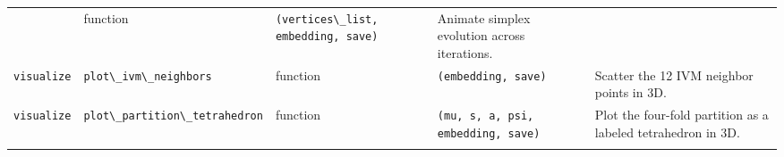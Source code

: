 \documentclass[
  10pt,
]{article}
\newcommand{\passthrough}[1]{#1}
\begin{document}
\begin{longtable}[]{@{}lllll@{}}
\begin{minipage}[t]{0.17\columnwidth}
\end{minipage} & \begin{minipage}[t]{0.17\columnwidth}\raggedright
function\strut
\end{minipage} & \begin{minipage}[t]{0.17\columnwidth}\raggedright
\passthrough{\lstinline!(vertices\_list, embedding, save)!}\strut
\end{minipage} & \begin{minipage}[t]{0.17\columnwidth}\raggedright
Animate simplex evolution across iterations.\strut
\end{minipage}\tabularnewline
\begin{minipage}[t]{0.17\columnwidth}\raggedright
\passthrough{\lstinline!visualize!}\strut
\end{minipage} & \begin{minipage}[t]{0.17\columnwidth}\raggedright
\passthrough{\lstinline!plot\_ivm\_neighbors!}\strut
\end{minipage} & \begin{minipage}[t]{0.17\columnwidth}\raggedright
function\strut
\end{minipage} & \begin{minipage}[t]{0.17\columnwidth}\raggedright
\passthrough{\lstinline!(embedding, save)!}\strut
\end{minipage} & \begin{minipage}[t]{0.17\columnwidth}\raggedright
Scatter the 12 IVM neighbor points in 3D.\strut
\end{minipage}\tabularnewline
\begin{minipage}[t]{0.17\columnwidth}\raggedright
\passthrough{\lstinline!visualize!}\strut
\end{minipage} & \begin{minipage}[t]{0.17\columnwidth}\raggedright
\passthrough{\lstinline!plot\_partition\_tetrahedron!}\strut
\end{minipage} & \begin{minipage}[t]{0.17\columnwidth}\raggedright
function\strut
\end{minipage} & \begin{minipage}[t]{0.17\columnwidth}\raggedright
\passthrough{\lstinline!(mu, s, a, psi, embedding, save)!}\strut
\end{minipage} & \begin{minipage}[t]{0.17\columnwidth}\raggedright
Plot the four-fold partition as a labeled tetrahedron in 3D.\strut
\end{minipage}\tabularnewline
\begin{minipage}[t]{0.17\columnwidth}\raggedright

\end{minipage}
\end{longtable}
\end{document}
